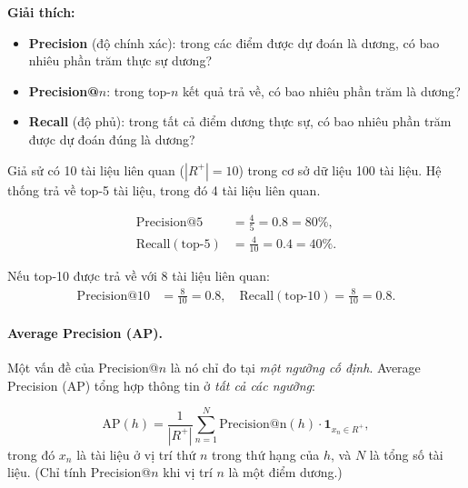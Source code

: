 \textbf{Giải thích:}
\begin{itemize}
    \item \textbf{Precision} (độ chính xác): trong các điểm được dự đoán là dương, có bao nhiêu phần trăm thực sự dương?
    \item \textbf{Precision@$n$}: trong top-$n$ kết quả trả về, có bao nhiêu phần trăm là dương?
    \item \textbf{Recall} (độ phủ): trong tất cả điểm dương thực sự, có bao nhiêu phần trăm được dự đoán đúng là dương?
\end{itemize}

\begin{example}
Giả sử có 10 tài liệu liên quan ($|R^+| = 10$) trong cơ sở dữ liệu 100 tài liệu. Hệ thống trả về top-5 tài liệu, trong đó 4 tài liệu liên quan.

\begin{align*}
    \mathrm{Precision@5} &= \frac{4}{5} = 0.8 = 80\%, \\
    \mathrm{Recall}(\text{top-5}) &= \frac{4}{10} = 0.4 = 40\%.
\end{align*}

Nếu top-10 được trả về với 8 tài liệu liên quan:
\begin{align*}
    \mathrm{Precision@10} &= \frac{8}{10} = 0.8, \quad \mathrm{Recall}(\text{top-10}) = \frac{8}{10} = 0.8.
\end{align*}
\end{example}

\paragraph{Average Precision (AP).}
Một vấn đề của Precision@$n$ là nó chỉ đo tại \emph{một ngưỡng cố định}. Average Precision (AP) tổng hợp thông tin ở \emph{tất cả các ngưỡng}:

\begin{definition}
\begin{equation}
    \mathrm{AP}(h) = \frac{1}{|R^+|} \sum_{n=1}^{N} \mathrm{Precision@n}(h) \cdot \mathbf{1}_{x_n \in R^+},
    \label{eq:ap}
\end{equation}
trong đó $x_n$ là tài liệu ở vị trí thứ $n$ trong thứ hạng của $h$, và $N$ là tổng số tài liệu. (Chỉ tính Precision@$n$ khi vị trí $n$ là một điểm dương.)
\end{definition}

